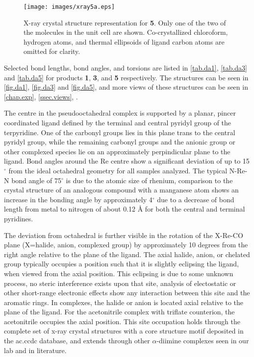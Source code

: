 \begin{figure}[!htbp]
 \begin{center}
  \texttt{[image: images/xray5a.eps]}
 \end{center}
\caption[X-ray crystal structure representation for \textbf{5}.]{X-ray crystal structure representation for \textbf{5}. Only one of the two of the molecules in the unit cell are shown. Co-crystallized chloroform, hydrogen atoms, and thermal ellipsoids of ligand carbon atoms are omitted for clarity.}
\label{fig.da5}
\end{figure}

Selected bond lengths, bond angles, and torsions are listed in \autoref{tab.da1}, \autoref{tab.da3} and \autoref{tab.da5} for products \textbf{1}, \textbf{3}, and \textbf{5} respectively. The structures can be seen in \autoref{fig.da1}, \autoref{fig.da3} and \autoref{fig.da5}, and more views of these structures can be seen in \autoref{chap.exp}, \autoref{ssec.views}, . 

The  centre in the pseudooctahedral complex is supported by a planar, pincer coordinated ligand defined by the terminal and central pyridyl group of the terpyridine. One of the carbonyl groups lies in this plane trans to the central pyridyl group, while the remaining carbonyl groups and the anionic group or other complexed species lie on an approximately perpindicular plane to the ligand. Bond angles around the Re centre show a significant deviation of up to 15$^\circ$ from the ideal octahedral geometry for all samples analyzed. The typical N-Re-N bond angle of 75$^\circ$ is due to the atomic size of rhenium, comparison to the crystal structure of an analogous compound with a manganese atom\autocite{compain2014} shows an increase in the bonding angle by approximately 4$^\circ$ due to a decrease of bond length from metal to nitrogen of about 0.12 \r{A} for both the central and terminal pyridines. 

The deviation from octahedral is further visible in the rotation of the X-Re-CO plane (X=halide, anion, complexed group) by approximately 10 degrees from the right angle relative to the plane of the ligand. The axial halide, anion, or chelated group typically occupies a position such that it is slightly eclipsing the ligand, when viewed from the axial position. This eclipsing is due to some unknown process, no steric interference exists upon that site, analysis of electostatic or other short-range electronic effects show any interaction between this site and the aromatic rings. In  complexes, the halide or anion is located axial relative to the plane of the ligand. For the acetonitrile complex with triflate counterion, the acetonitrile occupies the axial position. This site occupation holds through the complete set of x-ray crystal structures with a  core structure motif deposited in the \gls{ac.ccdc} database\autocite{allen2002}, and extends through other $\alpha$-diimine complexes seen in our lab and in literature\autocite{jurca2013}. 


